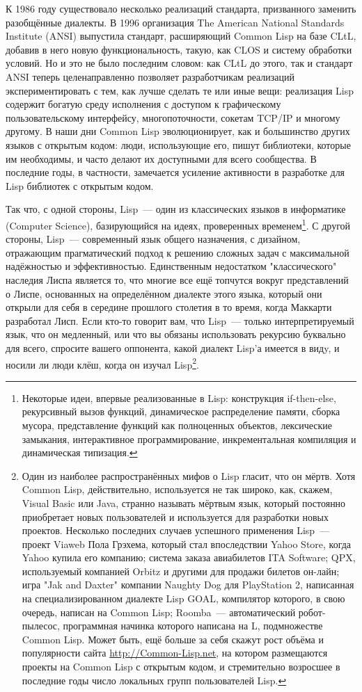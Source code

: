 К 1986 году существовало несколько реализаций стандарта, призванного заменить разобщённые
диалекты. В 1996 организация The American National Standards Institute (ANSI) выпустила
стандарт, расширяющий Common Lisp на базе CLtL, добавив в него новую функциональность,
такую, как CLOS и систему обработки условий. Но и это не было последним словом: как CLtL
до этого, так и стандарт ANSI теперь целенаправленно позволяет разработчикам реализаций
экспериментировать с тем, как лучше сделать те или иные вещи: реализация Lisp содержит
богатую среду исполнения с доступом к графическому пользовательскому интерфейсу,
многопоточности, сокетам TCP/IP и многому другому. В наши дни Common Lisp эволюционирует,
как и большинство других языков с открытым кодом: люди, использующие его, пишут
библиотеки, которые им необходимы, и часто делают их доступными для всего сообщества. В
последние годы, в частности, замечается усиление активности в разработке для Lisp
библиотек с открытым кодом.

Так что, с одной стороны, Lisp~--- один из классических языков в информатике (Computer
Science), базирующийся на идеях, проверенных временем\footnote{Некоторые идеи, впервые
  реализованные в Lisp: конструкция if-then-else, рекурсивный вызов функций, динамическое
  распределение памяти, сборка мусора, представление функций как полноценных объектов,
  лексические замыкания, интерактивное программирование, инкрементальная компиляция и
  динамическая типизация.}. С другой стороны, Lisp~--- современный язык общего назначения,
с дизайном, отражающим прагматический подход к решению сложных задач с максимальной
надёжностью и эффективностью. Единственным недостатком "классического" наследия Лиспа
является то, что многие все ещё топчутся вокруг представлений о Лиспе, основанных на
определённом диалекте этого языка, который они открыли для себя в середине прошлого
столетия в то время, когда Маккарти разработал Лисп. Если кто-то говорит вам, что Lisp~---
только интерпретируемый язык, что он медленный, или что вы обязаны использовать рекурсию
буквально для всего, спросите вашего оппонента, какой диалект Lisp'а имеется в видy, и
носили ли люди клёш, когда он изучал Lisp\footnote{Один из наиболее распространённых мифов
  о Lisp гласит, что он мёртв. Хотя Common Lisp, действительно, используется не так
  широко, как, скажем, Visual Basic или Java, странно называть мёртвым язык, который
  постоянно приобретает новых пользователей и используется для разработки новых
  проектов. Несколько последних случаев успешного применения Lisp~--- проект Viaweb Пола
  Грэхема, который стал впоследствии Yahoo Store, когда Yahoo купила его компанию; система
  заказа авиабилетов ITA Software; QPX, используемый компанией Orbitz и другими для
  продажи билетов он-лайн; игра "Jak and Daxter" компании Naughty Dog для PlayStation 2,
  написанная на специализированном диалекте Lisp GOAL, компилятор которого, в свою
  очередь, написан на Common Lisp; Roomba~--- автоматический робот-пылесос, программная
  начинка которого написана на L, подмножестве Common Lisp. Может быть, ещё больше за себя
  скажут рост объёма и популярности сайта \url{http://Common-Lisp.net}, на котором
  размещаются проекты на Common Lisp с открытым кодом, и стремительно возросшее в
  последние годы число локальных групп пользователей Lisp.}.

